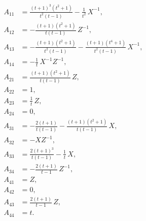 \begin{align*}
A_{11}&=\frac{\left(t + 1\right)^{3} \left(t^{2} + 1\right)}{t^{2} \left(t - 1\right)}- \frac{1}{t^{2}}\,X^{-1},\\
A_{12}&=- \frac{\left(t + 1\right) \left(t^{2} + 1\right)}{t \left(t - 1\right)}\,Z^{-1},\\
A_{13}&=- \frac{\left(t + 1\right) \left(t^{2} + 1\right)}{t^{2} \left(t - 1\right)}- \frac{\left(t + 1\right) \left(t^{4} + 1\right)}{t^{2} \left(t - 1\right)}\,X^{-1},\\
A_{14}&=- \frac{1}{t}\,X^{-1}Z^{-1},\\
A_{21}&=\frac{\left(t + 1\right) \left(t^{2} + 1\right)}{t \left(t - 1\right)}\,Z,\\
A_{22}&=1,\\
A_{23}&=\frac{1}{t}\,Z,\\
A_{24}&=0,\\
A_{31}&=- \frac{2 \left(t + 1\right)}{t \left(t - 1\right)}- \frac{\left(t + 1\right) \left(t^{2} + 1\right)}{t \left(t - 1\right)}\,X,\\
A_{32}&=-XZ^{-1},\\
A_{33}&=\frac{2 \left(t + 1\right)^{3}}{t \left(t - 1\right)}- \frac{1}{t}\,X,\\
A_{34}&=- \frac{2 \left(t + 1\right)}{t - 1}\,Z^{-1},\\
A_{41}&=Z,\\
A_{42}&=0,\\
A_{43}&=\frac{2 \left(t + 1\right)}{t - 1}\,Z,\\
A_{44}&=t.
\end{align*}
